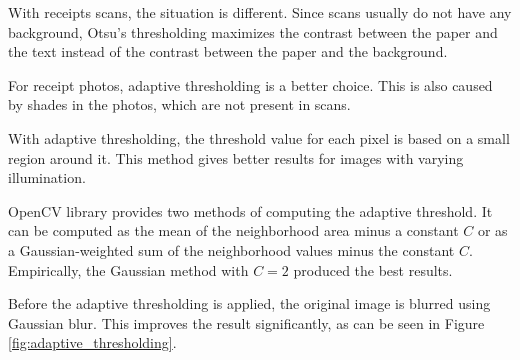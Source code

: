 \documentclass[
  printed, %
  table,   %
  oneside, %
  lof,     %
  lot,     %
]{fithesis3}
\begin{document}
\begin{enumerate}
    With receipts scans, the situation is different. Since scans usually do not have any background, Otsu's thresholding maximizes the contrast between the paper and the text instead of the contrast between the paper and the background.
    
    For receipt photos, adaptive thresholding is a better choice. This is also caused by shades in the photos, which are not present in scans.
    
    With adaptive thresholding, the threshold value for each pixel is based on a small region around it. This method gives better results for images with varying illumination. \cite{OpenCVThresholding}
    
    OpenCV library provides two methods of computing the adaptive threshold. It can be computed as the mean of the neighborhood area minus a constant $C$ or as a Gaussian-weighted sum of the neighborhood values minus the constant $C$. Empirically, the Gaussian method with $C = 2$ produced the best results.
    
    Before the adaptive thresholding is applied, the original image is blurred using Gaussian blur. This improves the result significantly, as can be seen in Figure \ref{fig:adaptive_thresholding}.
    

\end{enumerate}
\end{document}
